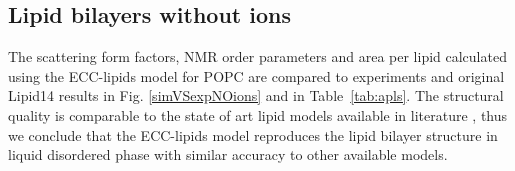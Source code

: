 \documentclass[aip,jcp,twocolumn]{revtex4}
\begin{document}
\subsection{Lipid bilayers without ions}
The scattering form factors, NMR order parameters and area per lipid calculated  
using the ECC-lipids model for POPC are compared to experiments and original
Lipid14 results in Fig. \ref{simVSexpNOions} and in Table~\ref{tab:apls}. 
The structural quality is comparable to the state of art lipid models available in literature \cite{ollila16},
thus we conclude that the ECC-lipids model reproduces the lipid bilayer structure
in liquid disordered phase with similar accuracy to other available models. 
\end{document}
